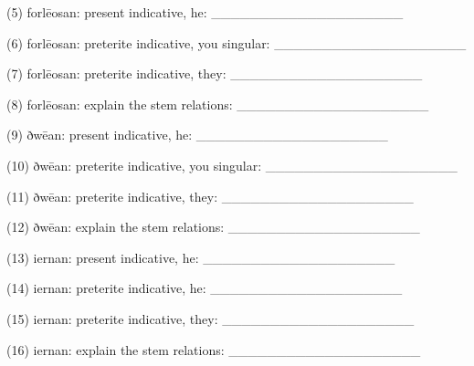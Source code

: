 \begin{minipage}{\linewidth}
(5) forlēosan: present indicative, he: \_\_\_\_\_\_\_\_\_\_\_\_\_\_\_\_\_\_\_\_

(6) forlēosan: preterite indicative, you singular: \_\_\_\_\_\_\_\_\_\_\_\_\_\_\_\_\_\_\_\_

(7) forlēosan: preterite indicative, they: \_\_\_\_\_\_\_\_\_\_\_\_\_\_\_\_\_\_\_\_

(8) forlēosan: explain the stem relations: \_\_\_\_\_\_\_\_\_\_\_\_\_\_\_\_\_\_\_\_

(9) ðwēan: present indicative, he: \_\_\_\_\_\_\_\_\_\_\_\_\_\_\_\_\_\_\_\_

(10) ðwēan: preterite indicative, you singular: \_\_\_\_\_\_\_\_\_\_\_\_\_\_\_\_\_\_\_\_

(11) ðwēan: preterite indicative, they: \_\_\_\_\_\_\_\_\_\_\_\_\_\_\_\_\_\_\_\_

(12) ðwēan: explain the stem relations: \_\_\_\_\_\_\_\_\_\_\_\_\_\_\_\_\_\_\_\_

(13) iernan: present indicative, he: \_\_\_\_\_\_\_\_\_\_\_\_\_\_\_\_\_\_\_\_

(14) iernan: preterite indicative, he: \_\_\_\_\_\_\_\_\_\_\_\_\_\_\_\_\_\_\_\_

(15) iernan: preterite indicative, they: \_\_\_\_\_\_\_\_\_\_\_\_\_\_\_\_\_\_\_\_

(16) iernan: explain the stem relations: \_\_\_\_\_\_\_\_\_\_\_\_\_\_\_\_\_\_\_\_

\end{minipage}\par\addvspace{4pt}

